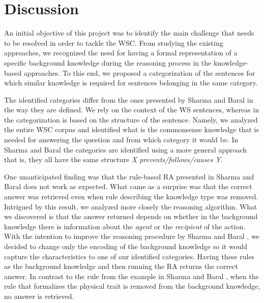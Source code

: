 \section{Discussion}
\label{section:Discussion}


An initial objective of this project was to identify the main challenge that needs to be resolved in order to tackle the WSC. From studying the existing approaches, we recognized the need for having a formal representation of a specific background knowledge during the reasoning process in the knowledge-based approaches. To this end, we proposed a categorization of the sentences for which similar knowledge is required for sentences belonging in the same category.

\begin{comment}
Emphasize these two
1. our categories are content based -> a combination of categories and knowledge about them could be a future work
2. we tried to identify the least amount of necessary commonsense knowledge (due to efficiency), which can consist of various different knowledge(s), that can exclude each other
\end{comment}


The identified categories differ from the ones presented by Sharma and Baral \cite{2018CommonsenseKT} in the way they are defined. We rely on the context of the WS sentences, whereas in \cite{2018CommonsenseKT} the categorization is based on the structure of the sentence. Namely, we analyzed the entire WSC corpus and identified what is the commonsense knowledge that is needed for answering the question and from which category it would be. In Sharma and Baral \cite{2018CommonsenseKT} the categories are identified using a more general approach that is, they all have the same structure \textit{X prevents/follows/causes Y}. 

One unanticipated finding was that the rule-based RA presented in Sharma and Baral \cite{2018CommonsenseKT} does not work as expected. What came as a surprise was that the correct answer was retrieved even when rule describing the knowledge type was removed. Intrigued by this result, we analyzed more closely the reasoning algorithm. What we discovered is that the answer returned depends on whether in the background knowledge there is information about the \textit{agent} or the \textit{recipient} of the action. With the intention to improve the reasoning procedure by  Sharma and Baral \cite{2018CommonsenseKT}, we decided to change only the encoding of the background knowledge so it would capture the characteristics to one of our identified categories. Having these rules as the background knowledge and then running the RA returns the correct answer. In contrast to the rule from the example in Sharma and Baral \cite{2018CommonsenseKT}, when the rule that formalizes the physical trait is removed from the background knowledge, no answer is retrieved. 

